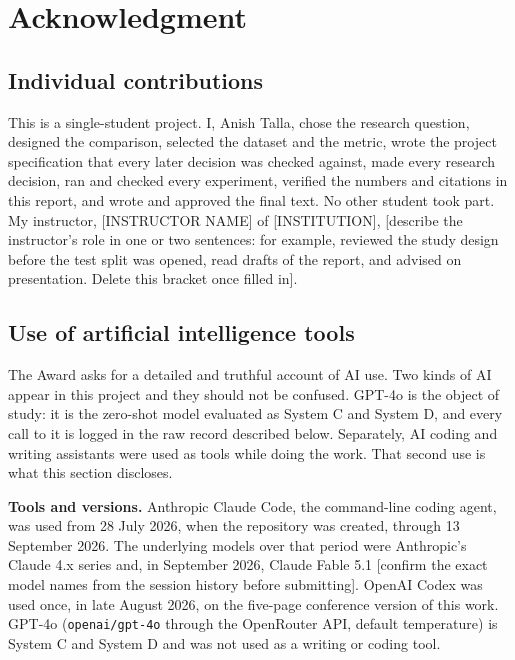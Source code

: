 \section*{Acknowledgment}

\subsection*{Individual contributions}

This is a single-student project. I, Anish Talla, chose the research
question, designed the comparison, selected the dataset and the metric,
wrote the project specification that every later decision was checked
against, made every research decision, ran and checked every experiment,
verified the numbers and citations in this report, and wrote and approved
the final text. No other student took part. My instructor,
[INSTRUCTOR NAME] of [INSTITUTION], [describe the instructor's role in one
or two sentences: for example, reviewed the study design before the test
split was opened, read drafts of the report, and advised on presentation.
Delete this bracket once filled in].

\subsection*{Use of artificial intelligence tools}

The Award asks for a detailed and truthful account of AI use. Two kinds of
AI appear in this project and they should not be confused. GPT-4o is the
object of study: it is the zero-shot model evaluated as System C and
System D, and every call to it is logged in the raw record described
below. Separately, AI coding and writing assistants were used as tools
while doing the work. That second use is what this section discloses.

\textbf{Tools and versions.} Anthropic Claude Code, the command-line
coding agent, was used from 28 July 2026, when the repository was created,
through 13 September 2026. The underlying models over that period were
Anthropic's Claude 4.x series and, in September 2026, Claude Fable 5.1
[confirm the exact model names from the session history before
submitting]. OpenAI Codex was used once, in late August 2026, on the
five-page conference version of this work. GPT-4o (\texttt{openai/gpt-4o}
through the OpenRouter API, default temperature) is System C and System D
and was not used as a writing or coding tool.

